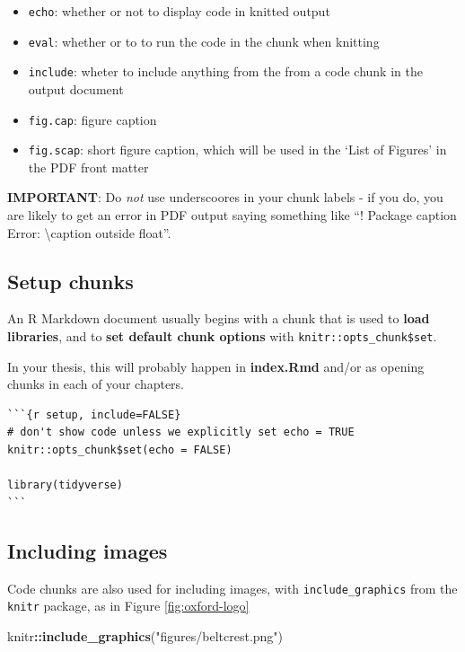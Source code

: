 \documentclass[a4paper, twoside]{templates/ociamthesis}
\providecommand{\tightlist}{%
  \setlength{\itemsep}{0pt}\setlength{\parskip}{0pt}}
\newenvironment{Shaded}{\begin{snugshade}}{\end{snugshade}}
\newcommand{\KeywordTok}[1]{\textcolor[rgb]{0.13,0.29,0.53}{\textbf{#1}}}
\newcommand{\NormalTok}[1]{#1}
\newcommand{\OperatorTok}[1]{\textcolor[rgb]{0.81,0.36,0.00}{\textbf{#1}}}
\newcommand{\StringTok}[1]{\textcolor[rgb]{0.31,0.60,0.02}{#1}}
\renewenvironment{Shaded}
{
  \vspace{4pt}%
  \begin{snugshade}%
}{%
  \end{snugshade}%
  \vspace{4pt}%
}
\begin{document}
\begin{itemize}
\tightlist
\item
  \texttt{echo}: whether or not to display code in knitted output
\item
  \texttt{eval}: whether or to to run the code in the chunk when knitting
\item
  \texttt{include}: wheter to include anything from the from a code chunk in the output document
\item
  \texttt{fig.cap}: figure caption
\item
  \texttt{fig.scap}: short figure caption, which will be used in the `List of Figures' in the PDF front matter
\end{itemize}

\textbf{IMPORTANT}: Do \emph{not} use underscoores in your chunk labels - if you do, you are likely to get an error in PDF output saying something like ``! Package caption Error: \textbackslash caption outside float''.

\hypertarget{setup-chunks}{%
\subsection{Setup chunks}\label{setup-chunks}}

An R Markdown document usually begins with a chunk that is used to \textbf{load libraries}, and to \textbf{set default chunk options} with \texttt{knitr::opts\_chunk\$set}.

In your thesis, this will probably happen in \textbf{index.Rmd} and/or as opening chunks in each of your chapters.

\begin{verbatim}
```{r setup, include=FALSE}
# don't show code unless we explicitly set echo = TRUE
knitr::opts_chunk$set(echo = FALSE)

library(tidyverse)
```
\end{verbatim}

\hypertarget{including-images}{%
\subsection{Including images}\label{including-images}}

Code chunks are also used for including images, with \texttt{include\_graphics} from the \texttt{knitr} package, as in Figure \ref{fig:oxford-logo}

\begin{Shaded}
\begin{Highlighting}[]
\NormalTok{knitr}\OperatorTok{::}\KeywordTok{include_graphics}\NormalTok{(}\StringTok{"figures/beltcrest.png"}\NormalTok{)}
\end{Highlighting}
\end{Shaded}
\end{document}
